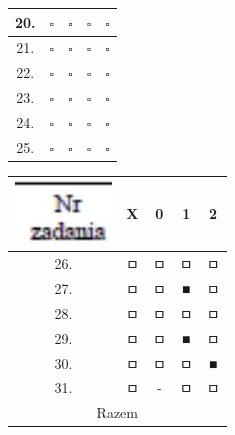\documentclass[10pt]{article}
\begin{document}
\begin{center}
\begin{tabular}{|c|c|c|c|c|}
\hline
20. & \(\square\) & \(\square\) & \(\square\) & \(\square\) \\
\hline
21. & \(\square\) & \(\square\) & \(\square\) & \(\square\) \\
\hline
22. & \(\square\) & \(\square\) & \(\square\) & \(\square\) \\
\hline
23. & \(\square\) & \(\square\) & \(\square\) & \(\square\) \\
\hline
24. & \(\square\) & \(\square\) & \(\square\) & \(\square\) \\
\hline
25. & \(\square\) & \(\square\) & \(\square\) & \(\square\) \\
\hline
\end{tabular}
\end{center}

\begin{center}
\begin{tabular}{|c|c|c|c|c|}
\hline
\includegraphics[max width=\textwidth]{2024_11_21_cce9c7ad32a1dbcd58dag-16(1)}
 & X & 0 & 1 & 2 \\
\hline
26. & ㅁ & ㅁ & ㅁ & ㅁ \\
\hline
27. & ㅁ & ㅁ & ■ & ㅁ \\
\hline
28. & ㅁ & ㅁ & ㅁ & ㅁ \\
\hline
29. & ㅁ & ㅁ & ■ & ㅁ \\
\hline
30. & ㅁ & ㅁ & ㅁ & ■ \\
\hline
31. & ㅁ & - & ㅁ & ㅁ \\
\hline
\multicolumn{5}{|c|}{Razem} \\
\hline
\end{tabular}
\end{center}
\end{document}
